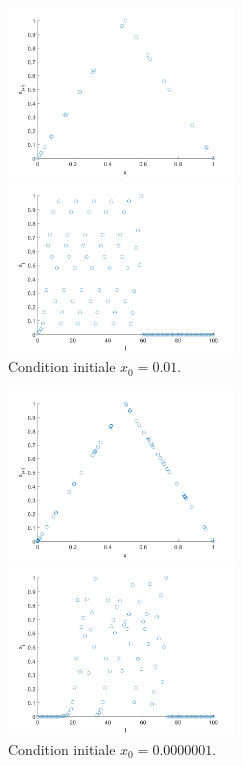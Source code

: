 \documentclass[a4paper, 12pt]{report}
\begin{document}
\begin{figure}[H]
    \centering
    \begin{minipage}[t]{6cm}
        \centering
        \includegraphics[width=6cm]{images/0dot01_x_i_x_i_plus_1.png}
    \end{minipage}\hspace{1cm}
    \begin{minipage}[t]{6cm}
        \centering
        \includegraphics[width=6cm]{images/0dot01_i_x_i.png}
    \end{minipage}
    \caption{Condition initiale $x_0 = 0.01$.}
\end{figure}


\begin{figure}[H]
    \centering
    \begin{minipage}[t]{6cm}
        \centering
        \includegraphics[width=6cm]{images/0dot0000001_x_i_x_i_plus_1.png}
    \end{minipage}\hspace{1cm}
    \begin{minipage}[t]{6cm}
        \centering
        \includegraphics[width=6cm]{images/0dot0000001_i_x_i.png}
    \end{minipage}
    \caption{Condition initiale $x_0 = 0.0000001$.}
\end{figure}
\end{document}
